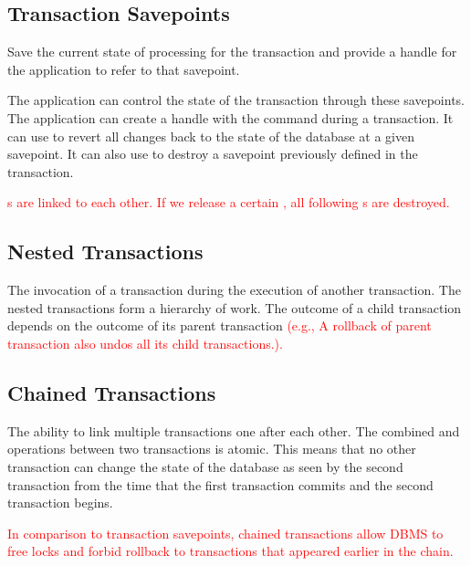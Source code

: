 \documentclass[11pt]{article}
\newcommand{\rr}[1]{\textcolor{red}{#1}}
\begin{document}
\subsection*{Transaction Savepoints}
Save the current state of processing for the transaction and provide a handle for the application 
to refer to that savepoint.

The application can control the state of the transaction through these savepoints. The application 
can create a handle with the  command during a transaction. It can use  
to revert all changes back to the state of the database at a given savepoint. It can also use 
 to destroy a savepoint previously defined in the transaction.

\rr{s are linked to each other. If we release a certain \sql{SAVEPOINT}, all following \sql{SAVEPOINT}s are destroyed.}
    
\subsection*{Nested Transactions}
The invocation of a transaction during the execution of another transaction. The nested transactions 
form a hierarchy of work. The outcome of a child transaction depends on the outcome of its parent 
transaction \rr{(e.g., A rollback of parent transaction also undos all its child transactions.). }

\subsection*{Chained Transactions}
The ability to link multiple transactions one after each other. 
The combined  and  operations between two transactions is atomic. This means 
that no other transaction can change the state of the database as seen by the second transaction 
from the time that the first transaction commits and the second transaction begins.

\rr{In comparison to transaction savepoints, chained transactions allow DBMS to free locks and forbid rollback to transactions that appeared earlier in the chain.}
    
\end{document}
